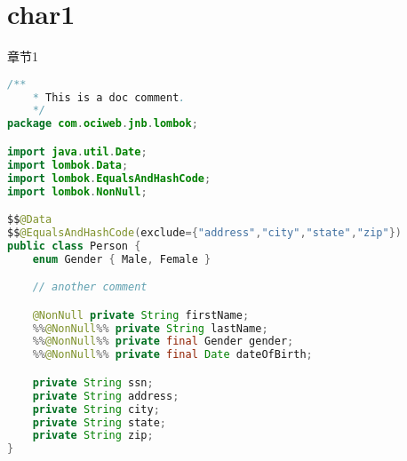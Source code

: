 \chapter{char1}
章节1

\begin{lstlisting}[language=java]
/**
    * This is a doc comment.
    */
package com.ociweb.jnb.lombok;

import java.util.Date;
import lombok.Data;
import lombok.EqualsAndHashCode;
import lombok.NonNull;

$$@Data
$$@EqualsAndHashCode(exclude={"address","city","state","zip"})
public class Person {
    enum Gender { Male, Female }

    // another comment

    @NonNull private String firstName;
    %%@NonNull%% private String lastName;
    %%@NonNull%% private final Gender gender;
    %%@NonNull%% private final Date dateOfBirth;

    private String ssn;
    private String address;
    private String city;
    private String state;
    private String zip;
}
\end{lstlisting}
